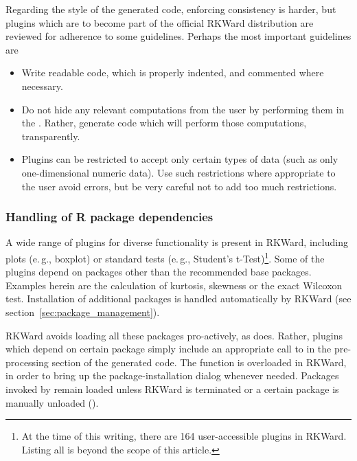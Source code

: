 Regarding the style of the generated  code, enforcing consistency is harder,
but plugins which are to become part of the official RKWard distribution are
reviewed for adherence to some guidelines. Perhaps the most important guidelines
are 

\begin{itemize}
  \item 
  Write readable code, which is properly indented, and commented where necessary.

  \item 
  Do not hide any relevant computations from the user by performing them in the
  . Rather, generate  code which will perform
  those computations, transparently.

  \item
  Plugins can be restricted to accept only certain types of data (such as only one-dimensional numeric data).
  Use such restrictions where appropriate to the user avoid errors, but be very careful not to add
  too much restrictions.
\end{itemize}

\subsubsection{Handling of R package dependencies}
\label{sec:technical_plugins_dependencies}
A wide range of plugins for diverse functionality is present in RKWard,
including plots (e.\,g., boxplot) or standard tests (e.\,g., Student's t-Test)\footnote{
  At the time of this writing, there are 164 user-accessible plugins in RKWard.
  Listing all is beyond the scope of this article.
}. Some
of the plugins depend on  packages other than the recommended  base packages.
Examples herein are the calculation of kurtosis, skewness or the exact Wilcoxon
test. Installation of additional packages is handled automatically by RKWard
(see section~\ref{sec:package_management}).

RKWard avoids loading all these packages pro-actively, as  does. Rather,
plugins which depend on certain package simply include an appropriate call to
 in the pre-processing section of the generated  code. The 
function is overloaded in RKWard, in order to bring up the package-installation
dialog whenever needed. Packages invoked by  remain loaded unless
RKWard is terminated or a certain package is manually unloaded ().

